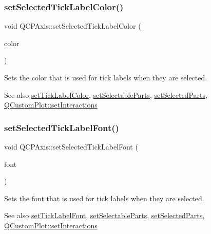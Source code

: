 \subsubsection{\texorpdfstring{setSelectedTickLabelColor()}{setSelectedTickLabelColor()}}
{\footnotesize\ttfamily void Q\+C\+P\+Axis\+::set\+Selected\+Tick\+Label\+Color (\begin{DoxyParamCaption}\item[{const Q\+Color \&}]{color }\end{DoxyParamCaption})}

Sets the color that is used for tick labels when they are selected.

\begin{DoxySeeAlso}{See also}
\mbox{\hyperlink{class_q_c_p_axis_a395e445c3fe496b935bee7b911ecfd1c}{set\+Tick\+Label\+Color}}, \mbox{\hyperlink{class_q_c_p_axis_a513f9b9e326c505d9bec54880031b085}{set\+Selectable\+Parts}}, \mbox{\hyperlink{class_q_c_p_axis_ab9d7a69277dcbed9119b3c1f25ca19c3}{set\+Selected\+Parts}}, \mbox{\hyperlink{class_q_custom_plot_a5ee1e2f6ae27419deca53e75907c27e5}{Q\+Custom\+Plot\+::set\+Interactions}} 
\end{DoxySeeAlso}
\mbox{\label{class_q_c_p_axis_a845ccb560b7bc5281098a5be494145f6}} 
\subsubsection{\texorpdfstring{setSelectedTickLabelFont()}{setSelectedTickLabelFont()}}
{\footnotesize\ttfamily void Q\+C\+P\+Axis\+::set\+Selected\+Tick\+Label\+Font (\begin{DoxyParamCaption}\item[{const Q\+Font \&}]{font }\end{DoxyParamCaption})}

Sets the font that is used for tick labels when they are selected.

\begin{DoxySeeAlso}{See also}
\mbox{\hyperlink{class_q_c_p_axis_a2b8690c4e8dbc39d9185d2b398ce7a6c}{set\+Tick\+Label\+Font}}, \mbox{\hyperlink{class_q_c_p_axis_a513f9b9e326c505d9bec54880031b085}{set\+Selectable\+Parts}}, \mbox{\hyperlink{class_q_c_p_axis_ab9d7a69277dcbed9119b3c1f25ca19c3}{set\+Selected\+Parts}}, \mbox{\hyperlink{class_q_custom_plot_a5ee1e2f6ae27419deca53e75907c27e5}{Q\+Custom\+Plot\+::set\+Interactions}} 
\end{DoxySeeAlso}
\mbox{\label{class_q_c_p_axis_a8360502685eb782edbf04019c9345cdc}} 
